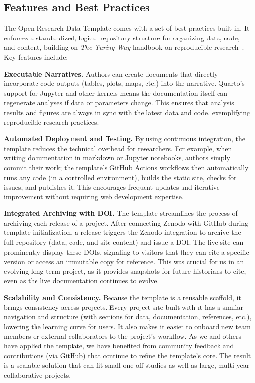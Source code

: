 \documentclass[final]{anthology-ch} %
\begin{document}
\subsection{Features and Best Practices}\label{features-and-best-practices}

The Open Research Data Template comes with a set of best practices built in. It enforces a standardized, logical repository structure for organizing data, code, and content, building on \emph{The Turing Way} handbook on reproducible research~\cite{theturingwaycommunity2025}. Key features include:



\noindent
\textbf{Executable Narratives.} Authors can create documents that directly incorporate code outputs (tables, plots, maps, etc.) into the narrative. Quarto's support for Jupyter and other kernels means the documentation itself can regenerate analyses if data or parameters change. This ensures that analysis results and figures are always in sync with the latest data and code, exemplifying reproducible research practices.



\noindent
\textbf{Automated Deployment and Testing.} By using continuous integration, the template reduces the technical overhead for researchers. For example, when writing documentation in markdown or Jupyter notebooks, authors simply commit their work; the template's GitHub Actions workflows then automatically runs any code (in a controlled environment), builds the static site, checks for issues, and publishes it. This encourages frequent updates and iterative improvement without requiring web development expertise.



\noindent
\textbf{Integrated Archiving with DOI.} The template streamlines the process of archiving each release of a project. After connecting Zenodo with GitHub during template initialization, a release triggers the Zenodo integration to archive the full repository (data, code, and site content) and issue a DOI. The live site can prominently display these DOIs, signaling to visitors that they can cite a specific version or access an immutable copy for reference. This was crucial for us in an evolving long-term project, as it provides snapshots for future historians to cite, even as the live documentation continues to evolve.



\noindent
\textbf{Scalability and Consistency.} Because the template is a reusable scaffold, it brings consistency across projects. Every project site built with it has a similar navigation and structure (with sections for data, documentation, references, etc.), lowering the learning curve for users. It also makes it easier to onboard new team members or external collaborators to the project's workflow. As we and others have applied the template, we have benefited from community feedback and contributions (via GitHub) that continue to refine the template's core. The result is a scalable solution that can fit small one-off studies as well as large, multi-year collaborative projects.
\end{document}
